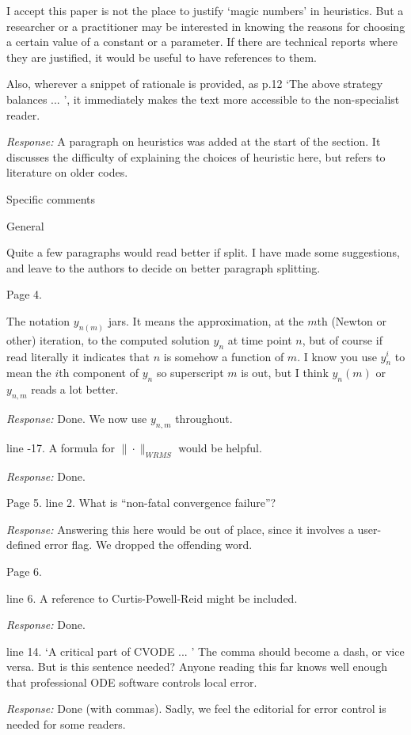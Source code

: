 \documentclass[12pt]{letter}
\begin{document}
I accept this paper is not the place to justify `magic numbers' in
heuristics. But a researcher or a practitioner may be interested in
knowing the reasons for choosing a certain value of a constant or a
parameter. If there are technical reports where they are justified, it
would be useful to have references to them.

Also, wherever a snippet of rationale is provided, as p.12 `The above
strategy balances ... ', it immediately makes the text more accessible
to the non-specialist reader.

{\em Response:} A paragraph on heuristics was added at the start of
the section.  It discusses the difficulty of explaining the choices of
heuristic here, but refers to literature on older codes.


Specific comments

General

Quite a few paragraphs would read better if split. I have made some
suggestions, and leave to the authors to decide on better paragraph
splitting.


Page 4.

The notation $y_{n(m)}$ jars. It means the approximation, at the $m$th
(Newton or other) iteration, to the computed solution $y_n$ at time
point $n$, but of course if read literally it indicates that $n$ is
somehow a function of $m$.  I know you use $y^i_n$ to mean the $i$th
component of $y_n$ so superscript $m$ is out, but I think $y_n(m)$ or
$y_{n,m}$ reads a lot better.

{\em Response:} Done.  We now use $y_{n,m}$ throughout.

line -17. A formula for $\|\cdot\|_{WRMS}$ would be helpful.

{\em Response:} Done.

Page 5. line 2. What is ``non-fatal convergence failure''?

{\em Response:} Answering this here would be out of place, since it
involves a user-defined error flag.  We dropped the offending word.

Page 6.

line 6. A reference to Curtis-Powell-Reid might be included.

{\em Response:} Done.

line 14. `A critical part of CVODE ... ' The comma should become a
dash, or vice versa.  But is this sentence needed? Anyone reading this
far knows well enough that professional ODE software controls local error.

{\em Response:} Done (with commas).  Sadly, we feel the editorial for
error control is needed for some readers.
\end{document}
